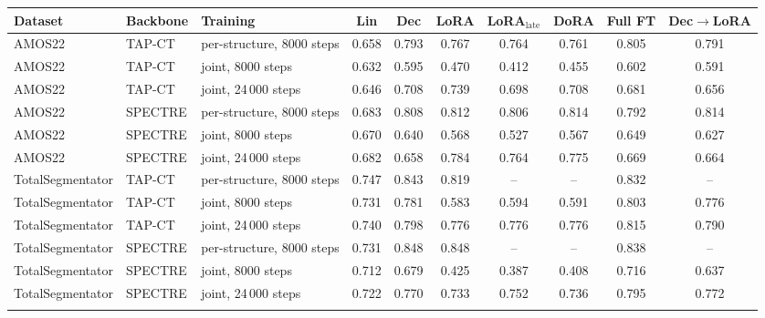 \begin{tabular}{lllccccccc}
\toprule
Dataset & Backbone & Training & Lin & Dec & LoRA & LoRA$_{\text{late}}$ & DoRA & Full FT & Dec$\to$LoRA \\
\midrule
AMOS22 & TAP-CT & per-structure, 8000 steps & 0.658 & 0.793 & 0.767 & 0.764 & 0.761 & 0.805 & 0.791 \\
AMOS22 & TAP-CT & joint, 8000 steps & 0.632 & 0.595 & 0.470 & 0.412 & 0.455 & 0.602 & 0.591 \\
AMOS22 & TAP-CT & joint, 24\,000 steps & 0.646 & 0.708 & 0.739 & 0.698 & 0.708 & 0.681 & 0.656 \\
\addlinespace[2pt]
AMOS22 & SPECTRE & per-structure, 8000 steps & 0.683 & 0.808 & 0.812 & 0.806 & 0.814 & 0.792 & 0.814 \\
AMOS22 & SPECTRE & joint, 8000 steps & 0.670 & 0.640 & 0.568 & 0.527 & 0.567 & 0.649 & 0.627 \\
AMOS22 & SPECTRE & joint, 24\,000 steps & 0.682 & 0.658 & 0.784 & 0.764 & 0.775 & 0.669 & 0.664 \\
\addlinespace[2pt]
TotalSegmentator & TAP-CT & per-structure, 8000 steps & 0.747 & 0.843 & 0.819 & -- & -- & 0.832 & -- \\
TotalSegmentator & TAP-CT & joint, 8000 steps & 0.731 & 0.781 & 0.583 & 0.594 & 0.591 & 0.803 & 0.776 \\
TotalSegmentator & TAP-CT & joint, 24\,000 steps & 0.740 & 0.798 & 0.776 & 0.776 & 0.776 & 0.815 & 0.790 \\
\addlinespace[2pt]
TotalSegmentator & SPECTRE & per-structure, 8000 steps & 0.731 & 0.848 & 0.848 & -- & -- & 0.838 & -- \\
TotalSegmentator & SPECTRE & joint, 8000 steps & 0.712 & 0.679 & 0.425 & 0.387 & 0.408 & 0.716 & 0.637 \\
TotalSegmentator & SPECTRE & joint, 24\,000 steps & 0.722 & 0.770 & 0.733 & 0.752 & 0.736 & 0.795 & 0.772 \\
\addlinespace[2pt]
\bottomrule
\end{tabular}
